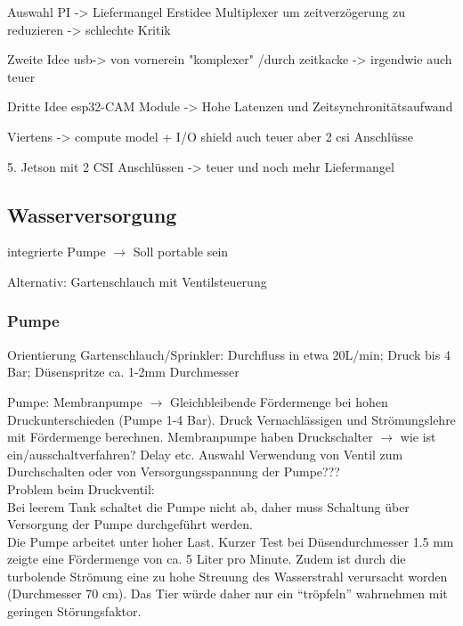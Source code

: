 Auswahl PI -> Liefermangel
Erstidee Multiplexer um zeitverzögerung zu reduzieren -> schlechte Kritik

Zweite Idee usb-> von vornerein "komplexer" /durch zeitkacke -> irgendwie auch teuer

Dritte Idee esp32-CAM Module -> Hohe Latenzen und Zeitsynchronitätsaufwand

Viertens -> compute model + I/O shield auch teuer aber 2 csi Anschlüsse

5. Jetson mit 2 CSI Anschlüssen -> teuer und noch mehr Liefermangel

\subsection{Wasserversorgung}

integrierte Pumpe $\rightarrow$ Soll portable sein

Alternativ: Gartenschlauch mit Ventilsteuerung

\subsubsection{Pumpe}

Orientierung Gartenschlauch/Sprinkler:
Durchfluss in etwa 20L/min; Druck bis 4 Bar; Düsenspritze ca. 1-2mm Durchmesser

Pumpe: Membranpumpe $\rightarrow$ Gleichbleibende Fördermenge
bei hohen Druckunterschieden (Pumpe 1-4 Bar).
Druck Vernachlässigen und Strömungslehre mit Fördermenge
berechnen. Membranpumpe haben Druckschalter $\rightarrow$
wie ist ein/ausschaltverfahren? Delay etc. Auswahl Verwendung
von Ventil zum Durchschalten oder von Versorgungsspannung der Pumpe???
\\
Problem beim Druckventil:\\
Bei leerem Tank schaltet die Pumpe nicht ab, daher muss Schaltung über Versorgung der Pumpe durchgeführt werden.
\\
Die Pumpe arbeitet unter hoher Last. Kurzer Test bei Düsendurchmesser 1.5 mm zeigte eine Fördermenge von ca. 5 Liter pro Minute. Zudem ist durch die turbolende Strömung eine zu hohe Streuung des Wasserstrahl verursacht worden (Durchmesser 70 cm). Das Tier würde daher nur ein \enquote{tröpfeln} wahrnehmen mit geringen Störungsfaktor.

